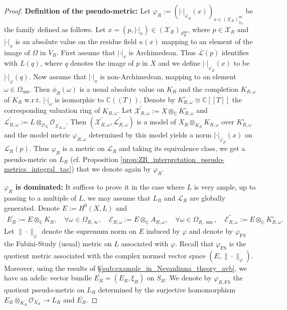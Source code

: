 \documentclass [11pt,reqno]{amsart}
\def\bC{{\mathbb{C}}}
\newcommand{\1}{\mathmybb{1}}
\def\cE{{\mathcal{E}}}
\def\cL{{\mathcal{L}}}
\def\cO{{\mathcal{O}}}
\def\cX{{\mathcal{X}}}
\def\an{\operatorname{an}}
\def\um{\operatorname{um}}
\def\tilde{\widetilde}
\begin{document}
\begin{proof}
\textbf{Definition of the pseudo-metric:} Let $\varphi_{R}:=(|\cdot|_{\varphi_{R}}(x))_{x\in(\cX_{R})_{S_{R}}^{\an}}$ be the family defined as follows. Let $x=(p,|\cdot|_{x})\in(\cX_{R})_{S_{R}^{\an}}$, where $p\in \cX_{R}$ and $|\cdot|_{x}$ is an absolute value on the residue field $\kappa(x)$ mapping to an element of the image of $\Omega$ in $V_{R}$. First assume that $|\cdot|_{x}$ is Archimedean. Thus $\cL(p)$ identifies with $L(q)$, where $q$ denotes the image of $p$ in $X$ and we define $|\cdot|_{\varphi_{R}}(x)$ to be $|\cdot|_{\varphi}(q)$. Now assume that $|\cdot|_{x}$ is non-Archimedean, mapping to an element $\omega\in\Omega_{\um}$. Then $\phi_R(\omega)$ is a usual absolute value on $K_{R}$ and the completion $K_{R,\omega}$ of $K_{R}$ w.r.t. $|\cdot|_{\omega}$ is isomorphic to $\bC((T))$. Denote by $K_{R,\omega}^{\circ}\cong\bC[[T]]$ the corresponding valuation ring of $K_{R,\omega}$. Let $\tilde{\cX_{R,\omega}}:=X\otimes_{\bC}K_{R,\omega}^{\circ}$ and $\tilde{\cL_{R,\omega}}:=L \otimes_{\cO_{X}} \cO_{\tilde{\cX_{R,\omega}}}$. Then $(\tilde{\cX_{R,\omega}},\tilde{\cL_{R,\omega}})$ is a model of $X_R \otimes_{K_R} K_{R,\omega}$ over $K_{R,\omega}^{\circ}$ and the model metric $\varphi_{R,\omega}$ determined by this model yields a norm $|\cdot|_{\varphi_{R}}(x)$ on $\cL_{R}(p)$. Thus $\varphi_{R}$ is a metric on $\cL_{R}$ and taking its equivalence class, we get a pseudo-metric on $L_{R}$ (cf. Proposition \ref{prop:ZR_interpretation_pseudo-metrics_integral_tac}) that we denote again by $\varphi_{R}$.

\textbf{$\varphi_{R}$ is dominated:} It suffices to prove it in the case where $L$ is very ample, up to passing to a multiple of $L$, we may assume that $L_{R}$ and $\cL_{R}$ are globally generated. Denote $E := H^0(X,L)$ and
\begin{align*}
E_R := E \otimes_{\bC} K_{R},\quad \forall \omega\in \Omega_{R,\infty}, \quad \cE_{R,\omega} := E \otimes_{\bC} A_{R,\omega}, \quad\forall \omega\in \Omega_{R,\um},\quad \tilde{\cE_{R,\omega}} := E \otimes_{\bC} K_{R,\omega}^{\circ}.
\end{align*}
Let $\|\cdot\|_{\varphi}$ denote the supremum norm on $E$ induced by $\varphi$ and denote by $\varphi_{\mathrm{FS}}$ the Fubini-Study (usual) metric on $L$ associated with $\varphi$. Recall that $\varphi_{\mathrm{FS}}$ is the quotient metric associated with the complex normed vector space $(E,\|\cdot\|_{\varphi})$. Moreover, using the results of \S \ref{sub:example_in_Nevanlinna_theory_avb}, we have an adelic vector bundle $\overline{E_{R}}=(E_{R},\xi_{R})$ on $S_{R}$. We denote by $\varphi_{R,\mathrm{FS}}$ the quotient pseudo-metric on $L_{R}$ determined by the surjective homomorphism $E_{R}\otimes_{K_{R}} \cO_{X_{R}} \to L_{R}$ and $\overline{E_{R}}$. 


\end{proof}
\end{document}
